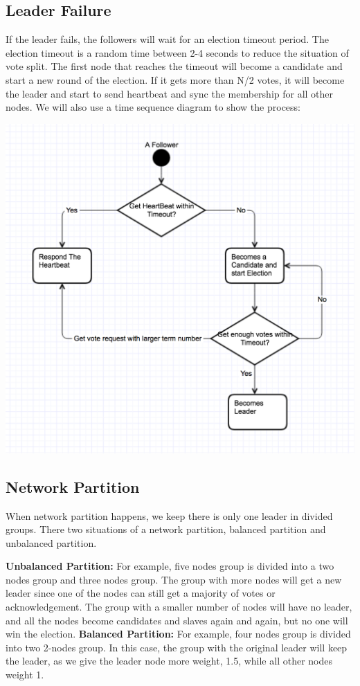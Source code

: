 \documentclass[a4paper,11pt]{article}
\begin{document}
\subsection{Leader Failure}
If the leader fails, the followers will wait for an election timeout period. The election timeout is a random time between 2-4 seconds to reduce the situation of vote split. The first node that reaches the timeout will become a candidate and start a new round of the election. If it gets more than N/2 votes, it will become the leader and start to send heartbeat and sync the membership for all other nodes. We will also use a time sequence diagram to show the process:
\begin{center}
    \includegraphics[scale=0.6]{assets/election}
\end{center}

\subsection{Network Partition}
When network partition happens, we keep there is only one leader in divided groups. There two situations of a network partition, balanced partition and unbalanced partition.
\begin{outline}
\1 \textbf{Unbalanced Partition:} For example, five nodes group is divided into a two nodes group and three nodes group. The group with more nodes will get a new leader since one of the nodes can still get a majority of votes or acknowledgement. The group with a smaller number of nodes will have no leader, and all the nodes become candidates and slaves again and again, but no one will win the election.
\1 \textbf{Balanced Partition:} For example, four nodes group is divided into two 2-nodes group. In this case, the group with the original leader will keep the leader, as we give the leader node more weight, 1.5, while all other nodes weight 1.
\end{outline}
\end{document}
